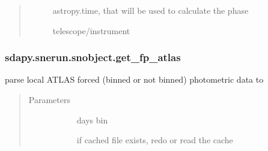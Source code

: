 \documentclass[letterpaper,10pt,english]{sphinxmanual}
\begin{document}
\begin{fulllineitems}
\begin{fulllineitems}
\begin{quote}
\begin{description}
\begin{description}
\item[{}] \leavevmode{[}\sphinxtitleref{str}{]}
astropy.time, that will be used to calculate the phase

\item[{}] \leavevmode{[}\sphinxtitleref{str}{]}
telescope/instrument

\end{description}

\end{description}\end{quote}

\end{fulllineitems}



\subsubsection{sdapy.snerun.snobject.get\_fp\_atlas}
\label{\detokenize{generated/sdapy.snerun.snobject.get_fp_atlas:sdapy-snerun-snobject-get-fp-atlas}}\label{\detokenize{generated/sdapy.snerun.snobject.get_fp_atlas::doc}}

\begin{fulllineitems}
\label{\detokenize{generated/sdapy.snerun.snobject.get_fp_atlas:sdapy.snerun.snobject.get_fp_atlas}}
parse local ATLAS forced (binned or not binned) photometric data to 
\begin{quote}\begin{description}
\item[{Parameters}] \leavevmode\begin{description}
\item[{}] \leavevmode{[}\sphinxtitleref{int}{]}
days bin

\item[{}] \leavevmode{[}\sphinxtitleref{bool}{]}
if cached file exists, redo or read the cache

\end{description}

\end{description}\end{quote}


\end{fulllineitems}
\end{fulllineitems}
\end{document}
